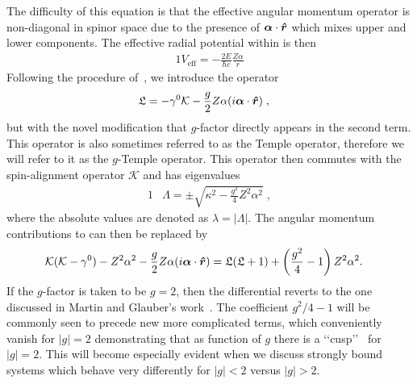The difficulty of this equation is that the effective angular momentum operator is non-diagonal in spinor space due to the presence of $\boldsymbol{\alpha}\cdot\boldsymbol{\hat{r}}$ which mixes upper and lower components. The effective radial potential within  is then
\begin{alignat}{1}
	\label{temp} V_\mathrm{eff}=-\frac{2E}{\hbar c}\frac{Z\alpha}{r}
\end{alignat}
Following the procedure of~\cite{Martin:1958zz}, we introduce the operator
\begin{alignat}{1}
\label{cou07} &\mathfrak{L}=-\gamma^{0}\mathcal{K}-\frac{g}{2}Z\alpha(i\boldsymbol{\alpha}\cdot\boldsymbol{\hat{r}})\;,
\end{alignat}
but with the novel modification that $g$-factor directly appears in the second term. This operator is also sometimes referred to as the Temple operator, therefore we will refer to it as the $g$-Temple operator. This operator then commutes with the spin-alignment operator $\mathcal{K}$ and has eigenvalues
\begin{alignat}{1}
\label{cou08} &\Lambda=\pm\sqrt{\kappa^{2}-\displaystyle\frac{\displaystyle g^{2}}{4}Z^{2}\alpha^{2}}\;,\end{alignat}
where the absolute values are denoted as $\lambda=|\Lambda|$. The angular momentum contributions to  can then be replaced by
\begin{alignat}{1}
\label{cou09} &\mathcal{K}(\mathcal{K}-\gamma^{0})-Z^{2}\alpha^{2}-\frac{g}{2}Z\alpha(i\boldsymbol{\alpha}\cdot\boldsymbol{\hat{r}})=\mathfrak{L}(\mathfrak{L}+1)+\left(\frac{g^{2}}{4}-1\right)Z^{2}\alpha^{2}.
\end{alignat}
If the $g$-factor is taken to be $g\!=\!2$, then the differential \ar reverts to the one discussed in Martin and Glauber\rq s work~\cite{Martin:1958zz}. The coefficient $g^{2}/4-1$ will be commonly seen to precede new more complicated terms, which conveniently vanish for $|g|=2$ demonstrating that as function of $g$ there is a \lq\lq cusp\rq\rq~\cite{Rafelski:2022bsv} for $|g|=2$. This will become especially evident when we discuss strongly bound systems which behave very differently for $|g|<2$ versus $|g|>2$. 

